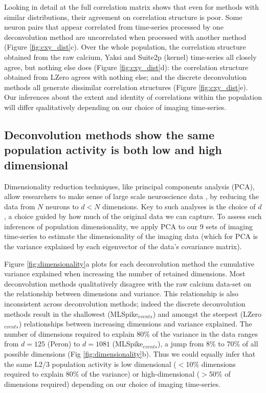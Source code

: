 \documentclass[a4paper,11pt]{article}
\begin{document}
Looking in detail at the full correlation matrix shows that even for methods with similar distributions, their agreement on correlation structure is poor. Some neuron pairs that appear correlated from time-series processed by one deconvolution method are uncorrelated when processed with another method (Figure \ref{fig:cxy_dist}c). Over the whole population, the correlation structure obtained from the raw calcium, Yaksi and Suite2p (kernel) time-series all closely agree, but nothing else does (Figure \ref{fig:cxy_dist}d): the correlation structure obtained from LZero agrees with nothing else; and the discrete deconvolution methods all generate dissimilar correlation structures (Figure \ref{fig:cxy_dist}e). Our inferences about the extent and identity of correlations within the population will differ qualitatively depending on our choice of imaging time-series.


\subsection{Deconvolution methods show the same population activity is both low and high dimensional}

Dimensionality reduction techniques, like principal components analysis (PCA), allow researchers to make sense of large scale neuroscience data \citep{Chapin1999-lf,Briggman2005-ht, Churchland2012-jq, Harvey2012-bh, Cunningham2014-vd,Kobak2016-xy}, by reducing the data from $N$ neurons to $d < N$ dimensions. Key to such analyses is the choice of $d$, a choice guided by how much of the original data we can capture. To assess such inferences of population dimensionality, we apply PCA to our 9 sets of imaging time-series to estimate the dimensionality of the imaging data (which for PCA is the variance explained by each eigenvector of the data's covariance matrix). 

Figure \ref{fig:dimensionality}a plots for each deconvolution method the cumulative variance explained when increasing the number of retained dimensions. Most deconvolution methods qualitatively disagree with the raw calcium data-set on the relationship between dimensions and variance. This relationship is also inconsistent across deconvolution methods; indeed the discrete deconvolution methods result in the shallowest (MLSpike$_{events}$) and amongst the steepest (LZero$_{events}$) relationships between increasing dimensions and variance explained. The number of dimensions required to explain 80$\%$ of the variance in the data ranges from $d=125$ (Peron) to $d=1081$ (MLSpike$_{events}$), a jump from 8$\%$ to 70$\%$ of all possible dimensions (Fig \ref{fig:dimensionality}b). Thus we could equally infer that the same L2/3 population activity is low dimensional ($<$10$\%$ dimensions required to explain 80$\%$ of the variance) or high-dimensional ($>$50$\%$ of dimensions required) depending on our choice of imaging time-series. 
\end{document}
